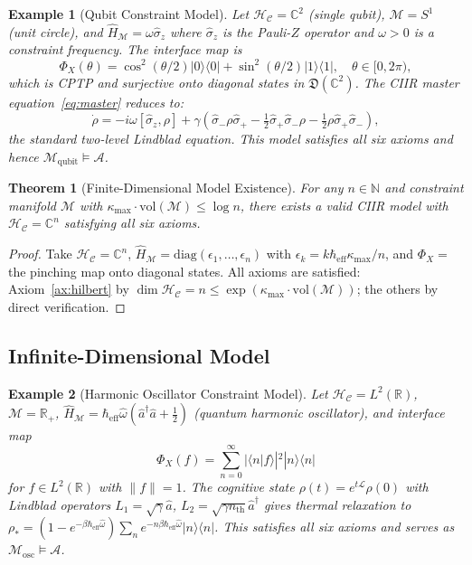 \documentclass[twocolumn,aps,prd,superscriptaddress,nofootinbib]{revtex4-2}
\newtheorem{theorem}{Theorem}[section]
\newtheorem{example}{Example}[section]
\newcommand{\HC}{\mathcal{H}_{\mathcal{C}}}
\newcommand{\CM}{\mathcal{M}}
\newcommand{\hatH}{\hat{H}}
\newcommand{\ket}[1]{|#1\rangle}
\newcommand{\bra}[1]{\langle #1|}
\begin{document}
\begin{example}[Qubit Constraint Model]
\label{ex:qubit}
Let $\HC = \mathbb{C}^2$ (single qubit), $\CM = S^1$ (unit circle),
and $\hatH_\CM = \omega\hat\sigma_z$ where $\hat\sigma_z$ is the Pauli-$Z$
operator and $\omega > 0$ is a constraint frequency.  The interface map is
\[
  \Phi_X(\theta) = \cos^2(\theta/2)\ket{0}\bra{0} + \sin^2(\theta/2)\ket{1}\bra{1},
  \quad \theta \in [0,2\pi),
\]
which is CPTP and surjective onto diagonal states in $\mathfrak{D}(\mathbb{C}^2)$.
The CIIR master equation~\eqref{eq:master} reduces to:
\[
  \dot\rho = -i\omega[\hat\sigma_z,\rho] + \gamma({\hat\sigma_-}\rho{\hat\sigma_+}
    - \tfrac12\hat\sigma_+\hat\sigma_-\rho - \tfrac12\rho\hat\sigma_+\hat\sigma_-),
\]
the standard two-level Lindblad equation.  This model satisfies all six axioms
and hence $\mathcal{M}_\mathrm{qubit} \models \mathcal{A}$.
\end{example}

\begin{theorem}[Finite-Dimensional Model Existence]
\label{thm:finitedim}
For any $n \in \mathbb{N}$ and constraint manifold $\CM$ with
$\kappa_\mathrm{max}\cdot\mathrm{vol}(\CM) \leq \log n$, there exists a valid
CIIR model with $\HC = \mathbb{C}^n$ satisfying all six axioms.
\end{theorem}

\begin{proof}
Take $\HC = \mathbb{C}^n$, $\hatH_\CM = \mathrm{diag}(\epsilon_1,\ldots,\epsilon_n)$
with $\epsilon_k = k\hbar_\mathrm{eff}\kappa_\mathrm{max}/n$, and
$\Phi_X = $ the pinching map onto diagonal states.  All axioms are satisfied:
Axiom~\ref{ax:hilbert} by $\dim\HC = n \leq \exp(\kappa_\mathrm{max}\cdot\mathrm{vol}(\CM))$;
the others by direct verification.
\end{proof}

\subsection{Infinite-Dimensional Model}
\label{subsec:infinitedim}

\begin{example}[Harmonic Oscillator Constraint Model]
\label{ex:oscillator}
Let $\HC = L^2(\mathbb{R})$, $\CM = \mathbb{R}_+$,
$\hatH_\CM = \hbar_\mathrm{eff}\hat\omega(\hat{a}^\dagger\hat{a} + \tfrac12)$
(quantum harmonic oscillator), and interface map
\[
  \Phi_X(f) = \sum_{n=0}^\infty |\langle n|f\rangle|^2 \ket{n}\bra{n}
\]
for $f \in L^2(\mathbb{R})$ with $\|f\|=1$.  The cognitive state
$\rho(t) = e^{t\mathcal{L}}\rho(0)$ with Lindblad operators
$L_1 = \sqrt{\gamma}\hat{a}$, $L_2 = \sqrt{\gamma n_\mathrm{th}}\hat{a}^\dagger$
gives thermal relaxation to $\rho_* = (1-e^{-\beta\hbar_\mathrm{eff}\hat\omega})\sum_n e^{-n\beta\hbar_\mathrm{eff}\hat\omega}\ket{n}\bra{n}$.
This satisfies all six axioms and serves as $\mathcal{M}_\mathrm{osc} \models \mathcal{A}$.
\end{example}
\end{document}
